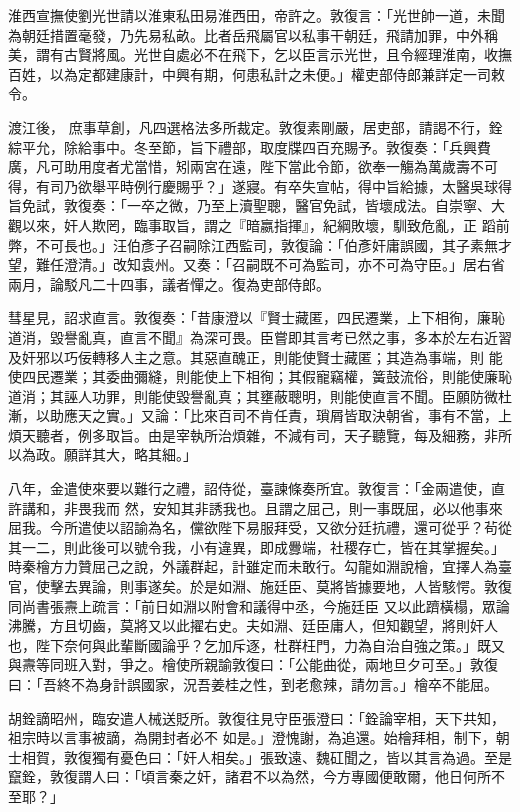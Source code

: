 \begin{pinyinscope}
 淮西宣撫使劉光世請以淮東私田易淮西田，帝許之。敦復言：「光世帥一道，未聞為朝廷措置毫發，乃先易私畝。比者岳飛屬官以私事干朝廷，飛請加罪，中外稱美，謂有古賢將風。光世自處必不在飛下，乞以臣言示光世，且令經理淮南，收撫百姓，以為定都建康計，中興有期，何患私計之未便。」權吏部侍郎兼詳定一司敕令。



 渡江後，
 庶事草創，凡四選格法多所裁定。敦復素剛嚴，居吏部，請謁不行，銓綜平允，除給事中。冬至節，旨下禮部，取度牒四百充賜予。敦復奏：「兵興費廣，凡可助用度者尤當惜，矧兩宮在遠，陛下當此令節，欲奉一觴為萬歲壽不可得，有司乃欲舉平時例行慶賜乎？」遂寢。有卒失宣帖，得中旨給據，太醫吳球得旨免試，敦復奏：「一卒之微，乃至上瀆聖聰，醫官免試，皆壞成法。自崇寧、大觀以來，奸人欺罔，臨事取旨，謂之『暗嬴指揮』，紀綱敗壞，馴致危亂，正
 蹈前弊，不可長也。」汪伯彥子召嗣除江西監司，敦復論：「伯彥奸庸誤國，其子素無才望，難任澄清。」改知袁州。又奏：「召嗣既不可為監司，亦不可為守臣。」居右省兩月，論駁凡二十四事，議者憚之。復為吏部侍郎。



 彗星見，詔求直言。敦復奏：「昔康澄以『賢士藏匿，四民遷業，上下相徇，廉恥道消，毀譽亂真，直言不聞』為深可畏。臣嘗即其言考已然之事，多本於左右近習及奸邪以巧佞轉移人主之意。其惡直醜正，則能使賢士藏匿；其造為事端，則
 能使四民遷業；其委曲彌縫，則能使上下相徇；其假寵竊權，簧鼓流俗，則能使廉恥道消；其誣人功罪，則能使毀譽亂真；其壅蔽聰明，則能使直言不聞。臣願防微杜漸，以助應天之實。」又論：「比來百司不肯任責，瑣屑皆取決朝省，事有不當，上煩天聽者，例多取旨。由是宰執所治煩雜，不減有司，天子聽覽，每及細務，非所以為政。願詳其大，略其細。」



 八年，金遣使來要以難行之禮，詔侍從，臺諫條奏所宜。敦復言：「金兩遣使，直許講和，非畏我而
 然，安知其非誘我也。且謂之屈己，則一事既屈，必以他事來屈我。今所遣使以詔諭為名，儻欲陛下易服拜受，又欲分廷抗禮，還可從乎？茍從其一二，則此後可以號令我，小有違異，即成釁端，社稷存亡，皆在其掌握矣。」時秦檜方力贊屈己之說，外議群起，計雖定而未敢行。勾龍如淵說檜，宜擇人為臺官，使擊去異論，則事遂矣。於是如淵、施廷臣、莫將皆據要地，人皆駭愕。敦復同尚書張燾上疏言：「前日如淵以附會和議得中丞，今施廷臣
 又以此躋橫榻，眾論沸騰，方且切齒，莫將又以此擢右史。夫如淵、廷臣庸人，但知觀望，將則奸人也，陛下奈何與此輩斷國論乎？乞加斥逐，杜群枉門，力為自治自強之策。」既又與燾等同班入對，爭之。檜使所親諭敦復曰：「公能曲從，兩地旦夕可至。」敦復曰：「吾終不為身計誤國家，況吾姜桂之性，到老愈辣，請勿言。」檜卒不能屈。



 胡銓謫昭州，臨安遣人械送貶所。敦復往見守臣張澄曰：「銓論宰相，天下共知，祖宗時以言事被謫，為開封者必不
 如是。」澄愧謝，為追還。始檜拜相，制下，朝士相賀，敦復獨有憂色曰：「奸人相矣。」張致遠、魏矼聞之，皆以其言為過。至是竄銓，敦復謂人曰：「頃言秦之奸，諸君不以為然，今方專國便敢爾，他日何所不至耶？」




\end{pinyinscope}
